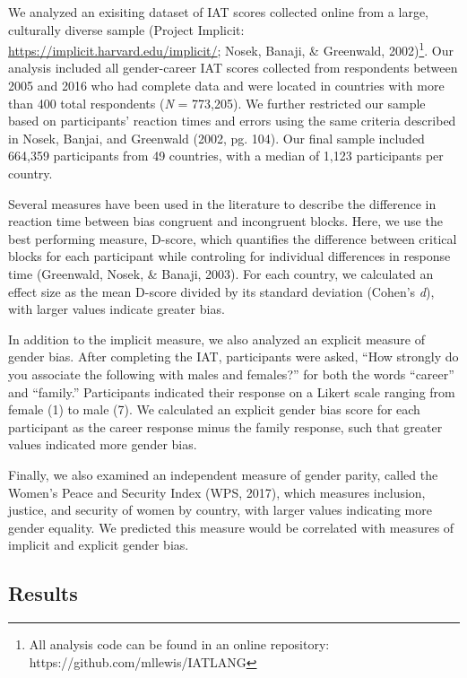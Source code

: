 \documentclass[10pt, letterpaper]{article}
\begin{document}
We analyzed an exisiting dataset of IAT scores collected online from a
large, culturally diverse sample (Project Implicit:
\url{https://implicit.harvard.edu/implicit/}; Nosek, Banaji, \&
Greenwald,
2002)\footnote{All analysis code can be found in an online repository: https://github.com/mllewis/IATLANG}.
Our analysis included all gender-career IAT scores collected from
respondents between 2005 and 2016 who had complete data and were located
in countries with more than 400 total respondents (\emph{N} = 773,205).
We further restricted our sample based on participants' reaction times
and errors using the same criteria described in Nosek, Banjai, and
Greenwald (2002, pg. 104). Our final sample included 664,359
participants from 49 countries, with a median of 1,123 participants per
country.

Several measures have been used in the literature to describe the
difference in reaction time between bias congruent and incongruent
blocks. Here, we use the best performing measure, D-score, which
quantifies the difference between critical blocks for each participant
while controling for individual differences in response time (Greenwald,
Nosek, \& Banaji, 2003). For each country, we calculated an effect size
as the mean D-score divided by its standard deviation (Cohen's
\emph{d}), with larger values indicate greater bias.

In addition to the implicit measure, we also analyzed an explicit
measure of gender bias. After completing the IAT, participants were
asked, ``How strongly do you associate the following with males and
females?'' for both the words ``career'' and ``family.'' Participants
indicated their response on a Likert scale ranging from female (1) to
male (7). We calculated an explicit gender bias score for each
participant as the career response minus the family response, such that
greater values indicated more gender bias.

Finally, we also examined an independent measure of gender parity,
called the Women's Peace and Security Index (WPS, 2017), which measures
inclusion, justice, and security of women by country, with larger values
indicating more gender equality. We predicted this measure would be
correlated with measures of implicit and explicit gender bias.

\subsection{Results}\label{results}
\end{document}
